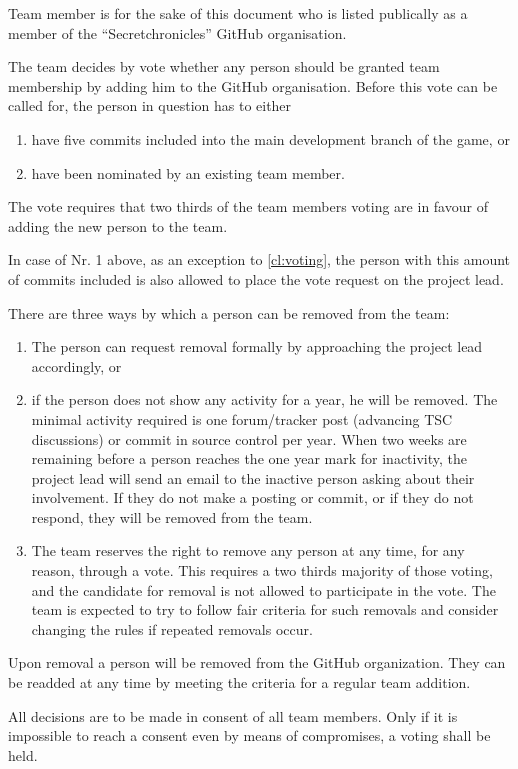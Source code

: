 \documentclass[10pt,a4paper,DIV=calc,headings=medium,twocolumn,final]{scrartcl}
\begin{document}
\begin{contract}

  Team member is for the sake of this document who is listed
  publically as a member of the “Secretchronicles” GitHub
  organisation.


  The team decides by vote whether any person should be granted team
  membership by adding him to the GitHub organisation. Before this
  vote can be called for, the person in question has to either

  \begin{enumerate}
  \item have five commits included into the main development branch of the
    game, or
  \item have been nominated by an existing team member.
  \end{enumerate}

  The vote requires that two thirds of the team members voting are in
  favour of adding the new person to the team.

  In case of Nr. 1 above, as an exception to \ref{cl:voting}, the
  person with this amount of commits included is also allowed to place
  the vote request on the project lead.


  There are three ways by which a person can be removed from the team:

  \begin{enumerate}
  \item The person can request removal formally by approaching the
    project lead accordingly, or
  \item if the person does not show any activity for a year, he will
    be removed.  The minimal activity required is one forum/tracker
    post (advancing TSC discussions) or commit in source control per
    year. When two weeks are remaining before a person reaches the one
    year mark for inactivity, the project lead will send an email to
    the inactive person asking about their involvement.  If they do
    not make a posting or commit, or if they do not respond, they will
    be removed from the team.
  \item The team reserves the right to remove any person at any time,
    for any reason, through a vote.  This requires a two thirds
    majority of those voting, and the candidate for removal is not
    allowed to participate in the vote.  The team is expected to try to
    follow fair criteria for such removals and consider changing the
    rules if repeated removals occur.
  \end{enumerate}

  Upon removal a person will be removed from the GitHub organization.
  They can be readded at any time by meeting the criteria for a
  regular team addition.


  All decisions are to be made in consent of all team members. Only if
  it is impossible to reach a consent even by means of compromises, a
  voting shall be held.
\end{contract}
\end{document}
